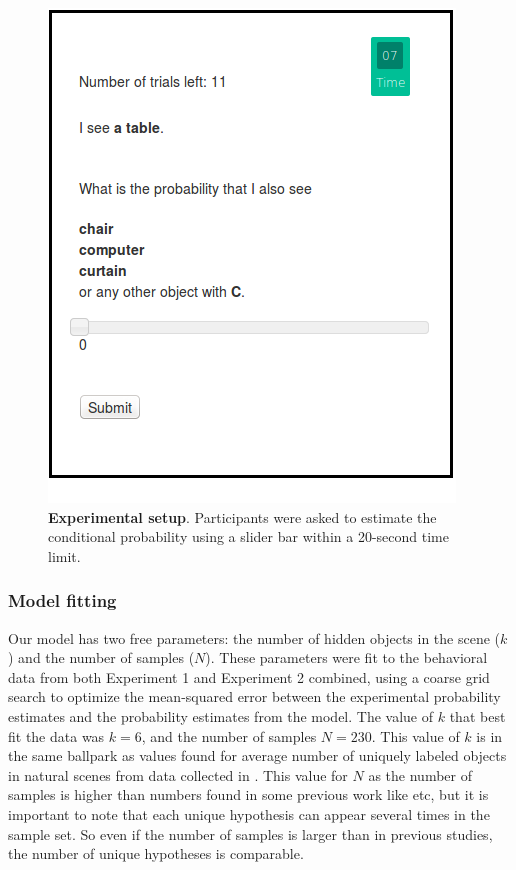 \begin{figure}[ht!]
\centering
\includegraphics[scale=0.9]{figures/screenshot.png}
\caption{\textbf{Experimental setup}. Participants were asked to estimate the conditional probability using a slider bar within a 20-second time limit.}
\label{fig:screenshot}
\end{figure}

\subsubsection{Model fitting}
Our model has two free parameters: the number of hidden objects in the scene ($k$) and the number of samples ($N$). These parameters were fit to the behavioral data from both Experiment 1 and Experiment 2 combined, using a coarse grid search to optimize the mean-squared error between the experimental probability estimates and the probability estimates from the model. The value of $k$ that best fit the data was $k=6$, and the number of samples $N= 230$. This value of $k$ is in the same ballpark as values found for average number of uniquely labeled objects in natural scenes from data collected in \cite{greene13}. This value for $N$ as the number of samples is higher than numbers found in some previous work like \cite{Vul2014} etc, but it is important to note that each unique hypothesis can appear several times in the sample set. So even if the number of samples is larger than in previous studies, the number of unique hypotheses is comparable.

